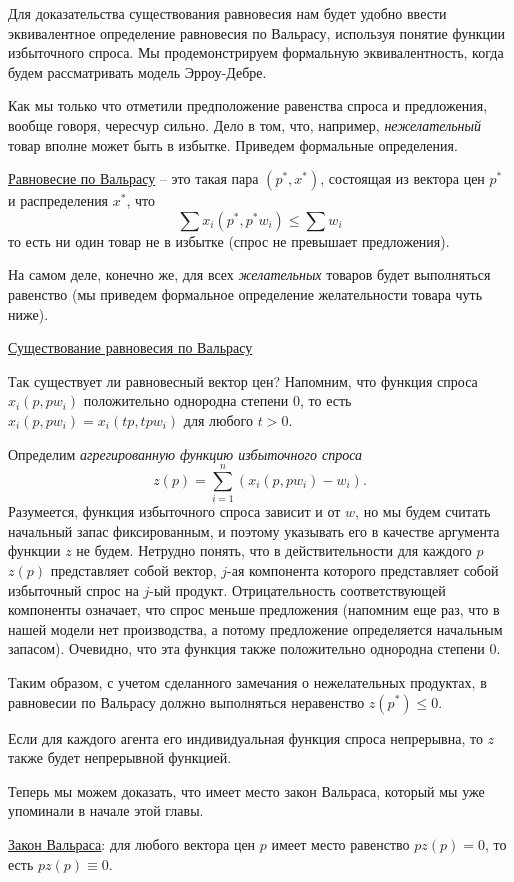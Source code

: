Для доказательства существования равновесия нам будет удобно ввести эквивалентное
определение равновесия по Вальрасу, используя понятие функции избыточного спроса.
Мы продемонстрируем формальную эквивалентность, когда будем рассматривать модель
Эрроу-Дебре.

Как мы только что отметили предположение равенства спроса и предложения,
вообще говоря, чересчур сильно. Дело в том, что, например, \emph{нежелательный}
товар вполне может быть в избытке. Приведем формальные определения.


\underline{Равновесие по Вальрасу} -- это такая пара $(p^*,x^*)$,
состоящая из вектора цен $p^*$ и распределения  $x^*$,
что
$$
\sum x_i(p^*,p^*w_i)\le\sum w_i
$$
то есть ни один товар не в избытке (спрос не превышает предложения).

На самом деле, конечно же, для всех \emph{желательных} товаров будет
выполняться равенство (мы приведем формальное определение желательности товара
чуть ниже).


\underline{Существование равновесия по Вальрасу}

Так существует ли равновесный вектор цен? Напомним, что
функция спроса $x_i(p,pw_i)$ положительно однородна степени 0, то есть
$x_i(p,pw_i)=x_i(tp,tpw_i)$ для любого $t>0$.

Определим \emph{агрегированную функцию избыточного спроса}
$$
z(p)=\sum^n_{i=1}(x_i(p,pw_i)-w_i).
$$
Разумеется, функция избыточного спроса зависит и от $w$,
но мы будем считать начальный запас фиксированным, и поэтому указывать
его в качестве аргумента функции $z$ не будем.
Нетрудно понять, что в действительности для каждого $p$
$z(p)$ представляет собой вектор, $j$-ая компонента которого
представляет собой избыточный спрос на $j$-ый продукт. Отрицательность
соответствующей компоненты означает, что спрос меньше предложения
(напомним еще раз, что в нашей модели нет производства, а потому
предложение определяется начальным запасом).
Очевидно, что эта функция также положительно однородна степени 0.

Таким образом, с учетом сделанного замечания о нежелательных продуктах,
в равновесии по Вальрасу должно выполняться неравенство
 $z(p^*)\le 0$.

Если для каждого агента его индивидуальная функция спроса непрерывна,
то $z$ также будет непрерывной функцией.

Теперь мы можем доказать, что имеет место закон Вальраса, который
мы уже упоминали в начале этой главы.

\underline{Закон Вальраса}: для любого вектора цен $p$ имеет место
равенство $pz(p)=0$, то есть $pz(p)\equiv0$.

